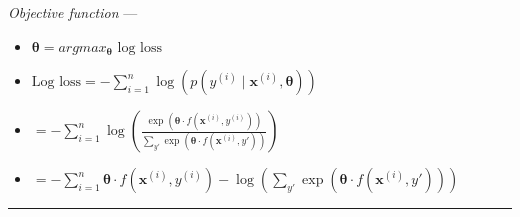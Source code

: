\emph{Objective function} --- 
\begin{itemize}
    \item $
    \boldsymbol{\theta} = argmax_{\boldsymbol{\theta}} \textrm{ log loss}
    $
    \item $\textrm{Log loss} = -\sum_{i=1}^n \log\left(p(y^{(i)} \mid \boldsymbol{x}^{(i)}, \boldsymbol{\theta})\right)$
    \item $
    = -\sum_{i=1}^n \log\left(\frac{\exp(\boldsymbol{\theta} \cdot f(\boldsymbol{x}^{(i)}, y^{(i)}))}{\sum_{y'} \exp(\boldsymbol{\theta} \cdot f(\boldsymbol{x}^{(i)}, y'))}\right)
    $
    \item $
    = -\sum_{i=1}^n \boldsymbol{\theta} \cdot f(\boldsymbol{x}^{(i)}, y^{(i)}) - \log\left(\sum_{y'} \exp(\boldsymbol{\theta} \cdot f(\boldsymbol{x}^{(i)}, y'))\right)
    $
\end{itemize}

{\color{lightgray}\hrule height 0.001mm}

